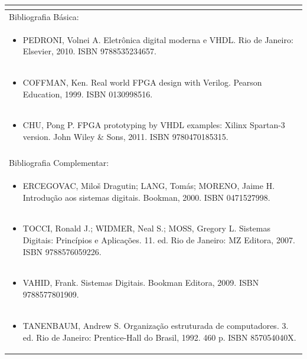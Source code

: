 \documentclass[11pt]{article}
\begin{document}
\begin{center}
\begin{longtable}{|p{4cm}|p{4cm}|p{4cm}|p{4cm}|}
\multicolumn{4}{|p{\dimexpr 16cm + 6\tabcolsep\relax}|}{}\\
\hline
\multicolumn{4}{|p{16cm}|}{Bibliografia Básica:}\\*
\multicolumn{4}{|p{\dimexpr 16cm + 6\tabcolsep\relax}|}{\begin{itemize}\item PEDRONI, Volnei A. Eletrônica digital moderna e VHDL. Rio de Janeiro: Elsevier, 2010. ISBN 9788535234657.\end{itemize}}\\
\multicolumn{4}{|p{\dimexpr 16cm + 6\tabcolsep\relax}|}{\begin{itemize}\item COFFMAN, Ken. Real world FPGA design with Verilog. Pearson Education, 1999. ISBN 0130998516.\end{itemize}}\\
\multicolumn{4}{|p{\dimexpr 16cm + 6\tabcolsep\relax}|}{\begin{itemize}\item CHU, Pong P. FPGA prototyping by VHDL examples: Xilinx Spartan-3 version. John Wiley \& Sons, 2011. ISBN 9780470185315.\end{itemize}}\\
\multicolumn{4}{|p{16cm}|}{}\\
\hline
\multicolumn{4}{|p{16cm}|}{Bibliografia Complementar:}\\*
\multicolumn{4}{|p{\dimexpr 16cm + 6\tabcolsep\relax}|}{\begin{itemize}\item ERCEGOVAC, Miloš Dragutin; LANG, Tomás; MORENO, Jaime H. Introdução aos sistemas digitais. Bookman, 2000. ISBN 0471527998.\end{itemize}}\\
\multicolumn{4}{|p{\dimexpr 16cm + 6\tabcolsep\relax}|}{\begin{itemize}\item TOCCI, Ronald J.; WIDMER, Neal S.; MOSS, Gregory L. Sistemas Digitais: Princípios e Aplicações. 11. ed. Rio de Janeiro: MZ Editora, 2007. ISBN 9788576059226.\end{itemize}}\\
\multicolumn{4}{|p{\dimexpr 16cm + 6\tabcolsep\relax}|}{\begin{itemize}\item VAHID, Frank. Sistemas Digitais. Bookman Editora, 2009. ISBN 9788577801909.\end{itemize}}\\
\multicolumn{4}{|p{\dimexpr 16cm + 6\tabcolsep\relax}|}{\begin{itemize}\item TANENBAUM, Andrew S. Organização estruturada de computadores. 3. ed. Rio de Janeiro: Prentice-Hall do Brasil, 1992. 460 p. ISBN 857054040X.\end{itemize}}\\

\end{longtable}
\end{center}
\end{document}
